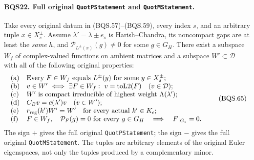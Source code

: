 \documentclass[11pt,a4paper]{article}
\numberwithin{equation}{section}
\theoremstyle{remark}\newtheorem{remark}[theorem]{Remark}
\begin{document}
\paragraph{BQS22. Full original \texttt{Quot\allowbreak PStatement} and \texttt{Quot\allowbreak MStatement}.}
\label{claim:BQS22}
Take every original datum in (BQS.57)--(BQS.59), every index $s$,
and an arbitrary tuple $x\in X_s^\pm$.
Assume $\lambda'=\lambda\pm e_s$ is Harish--Chandra, its
noncompact gaps are at least the \emph{same} $h$, and
$\mathcal P_{L^\pm(x)}(g)\ne0$ for some $g\in G_H$.
There exist a subspace $W_f$ of complex-valued functions on
ambient matrices and a subspace $W'\subset\mathcal D$ with all
of the following original properties:
\[
 \begin{array}{ll}
 {\rm (a)}&
  \text{Every }F\in W_f\text{ equals }L^\pm(y)
                        \text{ for some }y\in X_s^\pm;\\
 {\rm (b)}&
  v\in W'\ \Longleftrightarrow\
       \exists F\in W_f:\ v=\operatorname{toL2}(F)
                         \quad(v\in\mathcal D);\\
 {\rm (c)}&
  W'\text{ is compact irreducible of highest weight }
                               \Lambda(\lambda');\\
 {\rm (d)}& C_B v=c(\lambda')v\quad(v\in W');\\
 {\rm (e)}&
  r_{\rm reg}(k')W'=W'\quad\text{for every actual }k'\in K_\epsilon;\\
 {\rm (f)}&
  F\in W_f,\quad \mathcal P_F(g)=0\text{ for every }g\in G_H
               \quad\Longrightarrow\quad F|_{G_\epsilon}=0.
 \end{array}
 \tag{BQS.65}
\]
The sign $+$ gives the full original \texttt{Quot\allowbreak PStatement};
the sign $-$ gives the full original \texttt{Quot\allowbreak MStatement}.
The tuples are arbitrary elements of the original Euler eigenspaces,
not only the tuples produced by a complementary minor.
\end{document}
